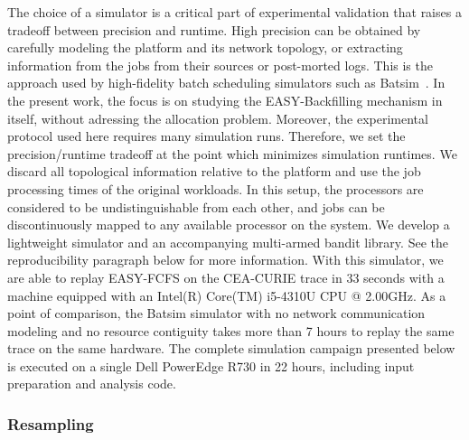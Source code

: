 \documentclass[sigconf,anonymous]{acmart}
\begin{document}
The choice of a simulator is a critical part of experimental validation that
raises a tradeoff between precision and runtime. High precision can be obtained
by carefully modeling the platform and its network topology, or extracting
information from the jobs from their sources or post-morted logs. This is the
approach used by high-fidelity batch scheduling simulators such as
Batsim~\cite{batsim}. In the present work, the focus is on studying the
EASY-Backfilling mechanism in itself, without adressing the allocation problem.
Moreover, the experimental protocol used here requires many simulation runs.
Therefore, we set the precision/runtime tradeoff at the point which minimizes
simulation runtimes. We discard all topological information relative to the
platform and use the job processing times of the original workloads. In this
setup, the processors are considered to be undistinguishable from each other,
and jobs can be discontinuously mapped to any available processor on the
system. We develop a lightweight simulator\cite{ocst} and an accompanying
multi-armed bandit library\cite{obandit}. See the reproducibility paragraph
below for more information.  With this simulator, we are able to replay
EASY-FCFS on the CEA-CURIE trace in 33 seconds with a machine equipped with an
Intel(R) Core(TM) i5-4310U CPU @ 2.00GHz. As a point of comparison, the Batsim
simulator with no network communication modeling and no resource contiguity
takes more than 7 hours to replay the same trace on the same hardware. The
complete simulation campaign presented below is executed on a single Dell
PowerEdge R730 in 22 hours, including input preparation and analysis code.

\subsubsection{Resampling}
\label{ssub:resampling}
\end{document}
